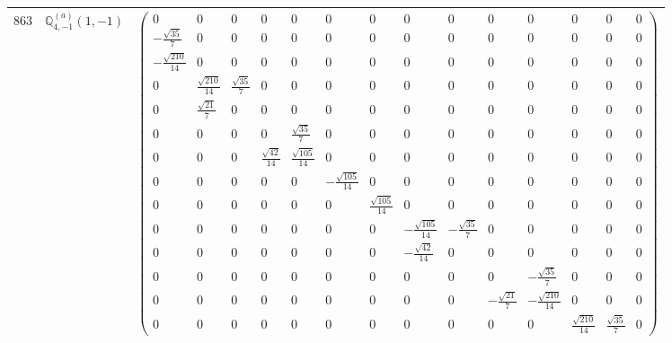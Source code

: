 \documentclass[fleqn,8pt,landscape]{jsarticle}
\begin{document}
\begin{center}
\begin{longtable}{ccc}
$ 863 $ & $ \mathbb{Q}_{4,-1}^{(a)}(1,-1) $ & $ \begin{pmatrix} 0 & 0 & 0 & 0 & 0 & 0 & 0 & 0 & 0 & 0 & 0 & 0 & 0 & 0 \\ - \frac{\sqrt{35}}{7} & 0 & 0 & 0 & 0 & 0 & 0 & 0 & 0 & 0 & 0 & 0 & 0 & 0 \\ - \frac{\sqrt{210}}{14} & 0 & 0 & 0 & 0 & 0 & 0 & 0 & 0 & 0 & 0 & 0 & 0 & 0 \\ 0 & \frac{\sqrt{210}}{14} & \frac{\sqrt{35}}{7} & 0 & 0 & 0 & 0 & 0 & 0 & 0 & 0 & 0 & 0 & 0 \\ 0 & \frac{\sqrt{21}}{7} & 0 & 0 & 0 & 0 & 0 & 0 & 0 & 0 & 0 & 0 & 0 & 0 \\ 0 & 0 & 0 & 0 & \frac{\sqrt{35}}{7} & 0 & 0 & 0 & 0 & 0 & 0 & 0 & 0 & 0 \\ 0 & 0 & 0 & \frac{\sqrt{42}}{14} & \frac{\sqrt{105}}{14} & 0 & 0 & 0 & 0 & 0 & 0 & 0 & 0 & 0 \\ 0 & 0 & 0 & 0 & 0 & - \frac{\sqrt{105}}{14} & 0 & 0 & 0 & 0 & 0 & 0 & 0 & 0 \\ 0 & 0 & 0 & 0 & 0 & 0 & \frac{\sqrt{105}}{14} & 0 & 0 & 0 & 0 & 0 & 0 & 0 \\ 0 & 0 & 0 & 0 & 0 & 0 & 0 & - \frac{\sqrt{105}}{14} & - \frac{\sqrt{35}}{7} & 0 & 0 & 0 & 0 & 0 \\ 0 & 0 & 0 & 0 & 0 & 0 & 0 & - \frac{\sqrt{42}}{14} & 0 & 0 & 0 & 0 & 0 & 0 \\ 0 & 0 & 0 & 0 & 0 & 0 & 0 & 0 & 0 & 0 & - \frac{\sqrt{35}}{7} & 0 & 0 & 0 \\ 0 & 0 & 0 & 0 & 0 & 0 & 0 & 0 & 0 & - \frac{\sqrt{21}}{7} & - \frac{\sqrt{210}}{14} & 0 & 0 & 0 \\ 0 & 0 & 0 & 0 & 0 & 0 & 0 & 0 & 0 & 0 & 0 & \frac{\sqrt{210}}{14} & \frac{\sqrt{35}}{7} & 0 \end{pmatrix} $ \\ \hline

\end{longtable}
\end{center}
\end{document}
